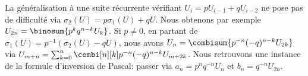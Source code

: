 

\begin{remark}
	La généralisation à une suite récurrente vérifiant
	$U_{i} = p U_{i-1} + q U_{i-2}$
	ne pose pas de difficulté via
	$\sigma_2(U) = p \sigma_1(U) + q U$.
	Nous obtenons par exemple $U_{2n} = \binosum{p^k q^{n-k} U_{k}}$.
	Si $p \neq 0$, en partant de
    $\sigma_1(U) = p^{-1}(\sigma_2(U) - q U)$,
    nous avons
    $U_n = \combisum{p^{-n} (-q)^{n-k} U_{2k}}$
    via
    $ U_{m+n}
    = \sum_{k=0}^n \combi[n][k] p^{-n} (-q)^{n-k} U_{m+2k}$.
    Nous retrouvons une instance de la formule d'inversion de Pascal:
    passer via
    $a_n = p^n q^{-n} U_{n}$
    et
    $b_n = q^{-n} U_{2n}$.
\end{remark}
